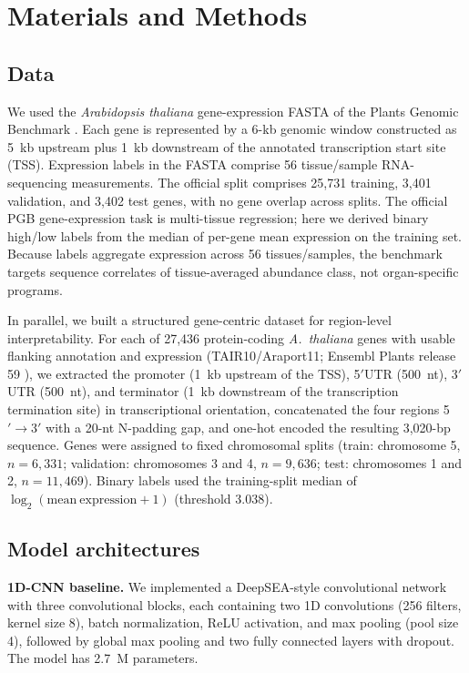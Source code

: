 \documentclass[11pt]{article}
\begin{document}
\section{Materials and Methods}

\subsection{Data}

We used the \emph{Arabidopsis thaliana} gene-expression FASTA of the Plants Genomic Benchmark \citep{mendoza2024,pgb2024}. Each gene is represented by a 6-kb genomic window constructed as 5~kb upstream plus 1~kb downstream of the annotated transcription start site (TSS). Expression labels in the FASTA comprise 56 tissue/sample RNA-sequencing measurements. The official split comprises 25,731 training, 3,401 validation, and 3,402 test genes, with no gene overlap across splits. The official PGB gene-expression task is multi-tissue regression; here we derived binary high/low labels from the median of per-gene mean expression on the training set. Because labels aggregate expression across 56 tissues/samples, the benchmark targets sequence correlates of tissue-averaged abundance class, not organ-specific programs.

In parallel, we built a structured gene-centric dataset for region-level interpretability. For each of 27,436 protein-coding \emph{A.\ thaliana} genes with usable flanking annotation and expression (TAIR10/Araport11; Ensembl Plants release 59 \citep{agi2000,lamesch2012,harrison2024}), we extracted the promoter (1~kb upstream of the TSS), 5$'$UTR (500~nt), 3$'$UTR (500~nt), and terminator (1~kb downstream of the transcription termination site) in transcriptional orientation, concatenated the four regions 5$'\rightarrow$3$'$ with a 20-nt N-padding gap, and one-hot encoded the resulting 3,020-bp sequence. Genes were assigned to fixed chromosomal splits (train: chromosome 5, $n=6{,}331$; validation: chromosomes 3 and 4, $n=9{,}636$; test: chromosomes 1 and 2, $n=11{,}469$). Binary labels used the training-split median of $\log_2(\mathrm{mean\ expression}+1)$ (threshold 3.038).

\subsection{Model architectures}

\textbf{1D-CNN baseline.} We implemented a DeepSEA-style convolutional network \citep{zhou2015} with three convolutional blocks, each containing two 1D convolutions (256 filters, kernel size 8), batch normalization, ReLU activation, and max pooling (pool size 4), followed by global max pooling and two fully connected layers with dropout. The model has 2.7~M parameters.
\end{document}
